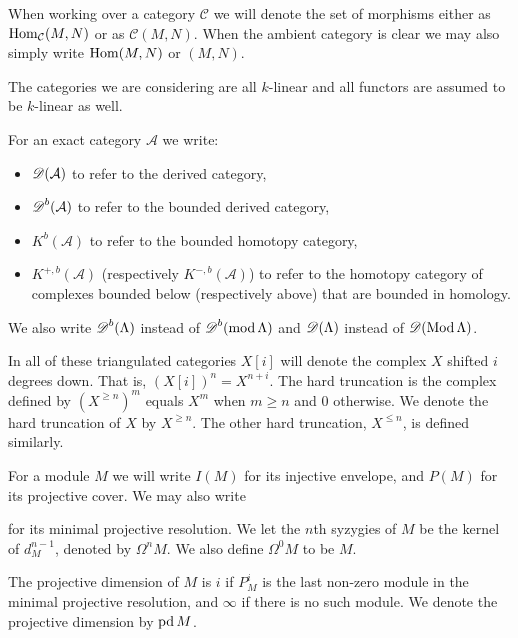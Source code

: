 
When working over a category $\mathcal C$ we will denote the set of morphisms either as $\operatorname{Hom}_{\mathcal C}(M, N)$ or as $\mathcal C(M,N)$. When the ambient category is clear we may also simply write $\operatorname{Hom}(M, N)$ or $(M, N)$.

The categories we are considering are all $k$-linear and all functors are assumed to be $k$-linear as well.


For an exact category $\mathcal A$ we write:
\begin{itemize}
	\item $\operatorname{\mathscr{D}}(\mathcal A)$ to refer to the derived category, 
	\item $\operatorname{\mathscr{D}}^b(\mathcal A)$ to refer to the bounded derived category, 
	\item $K^b(\mathcal A)$ to refer to the bounded homotopy category, 
	\item $K^{+,b}(\mathcal A)$ (respectively $K^{-,b}(\mathcal A)$) to refer to the homotopy category of complexes bounded below (respectively above) that are bounded in homology.
\end{itemize}
We also write $\operatorname{\mathscr{D}}^b(\Lambda)$ instead of $\operatorname{\mathscr{D}}^b(\operatorname{mod}\Lambda)$ and $\operatorname{\mathscr{D}}(\Lambda)$ instead of $\operatorname{\mathscr{D}}(\operatorname{Mod}\Lambda)$. 

In all of these triangulated categories $X[i]$ will denote the complex $X$ shifted $i$ degrees down. That is, $(X[i])^n = X^{n+i}$. The hard truncation is the complex defined by $(X^{\geq n})^m$ equals $X^m$ when $m \geq n$ and 0 otherwise. We denote the hard truncation of $X$ by $X^{\geq n}$. The other hard truncation, $X^{\leq n}$, is defined similarly.


For a module $M$ we will write $I(M)$ for its injective envelope, and $P(M)$ for its projective cover. We may also write 
\begin{center}
\end{center} 
for its minimal projective resolution. We let the $n$th syzygies of $M$ be the kernel of $d_M^{n-1}$, denoted by $\Omega^n M$. We also define $\Omega^0 M$ to be $M$.

The projective dimension of $M$ is $i$ if $P_M^i$ is the last non-zero module in the minimal projective resolution, and $\infty$ if there is no such module. We denote the projective dimension by $\operatorname{pd} M$.


